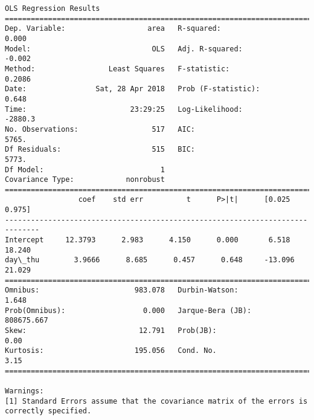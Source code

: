 \documentclass[11pt]{article}
\begin{document}
\begin{Verbatim}[commandchars=\\\{\}]
                            OLS Regression Results                            
==============================================================================
Dep. Variable:                   area   R-squared:                       0.000
Model:                            OLS   Adj. R-squared:                 -0.002
Method:                 Least Squares   F-statistic:                    0.2086
Date:                Sat, 28 Apr 2018   Prob (F-statistic):              0.648
Time:                        23:29:25   Log-Likelihood:                -2880.3
No. Observations:                 517   AIC:                             5765.
Df Residuals:                     515   BIC:                             5773.
Df Model:                           1                                         
Covariance Type:            nonrobust                                         
==============================================================================
                 coef    std err          t      P>|t|      [0.025      0.975]
------------------------------------------------------------------------------
Intercept     12.3793      2.983      4.150      0.000       6.518      18.240
day\_thu        3.9666      8.685      0.457      0.648     -13.096      21.029
==============================================================================
Omnibus:                      983.078   Durbin-Watson:                   1.648
Prob(Omnibus):                  0.000   Jarque-Bera (JB):           808675.667
Skew:                          12.791   Prob(JB):                         0.00
Kurtosis:                     195.056   Cond. No.                         3.15
==============================================================================

Warnings:
[1] Standard Errors assume that the covariance matrix of the errors is correctly specified.



\end{Verbatim}
\end{document}
